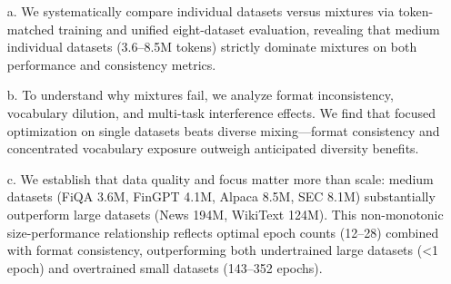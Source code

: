 \documentclass[11pt,a4paper,english,oneside]{book}
\begin{document}
\begin{itemize}
    \item[a.] We systematically compare individual datasets versus mixtures via token-matched training and unified eight-dataset evaluation, revealing that medium individual datasets (3.6–8.5M tokens) strictly dominate mixtures on both performance and consistency metrics.

    \item[b.] To understand why mixtures fail, we analyze format inconsistency, vocabulary dilution, and multi-task interference effects. We find that focused optimization on single datasets beats diverse mixing—format consistency and concentrated vocabulary exposure outweigh anticipated diversity benefits.

    \item[c.] We establish that data quality and focus matter more than scale: medium datasets (FiQA 3.6M, FinGPT 4.1M, Alpaca 8.5M, SEC 8.1M) substantially outperform large datasets (News 194M, WikiText 124M). This non-monotonic size-performance relationship reflects optimal epoch counts (12–28) combined with format consistency, outperforming both undertrained large datasets (<1 epoch) and overtrained small datasets (143–352 epochs).
\end{itemize}

\newpage

\tableofcontents
\listoffigures
\listoftables

\newpage
{}









\printbibliography

\newpage

\thispagestyle{firststyle}
\end{document}
